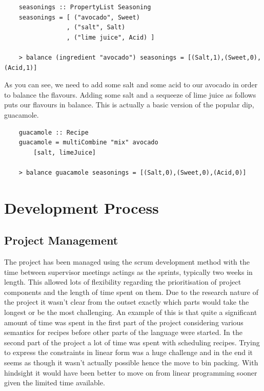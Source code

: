 \documentclass[11pt]{article}
\begin{document}
\begin{lstlisting}
    seasonings :: PropertyList Seasoning
    seasonings = [ ("avocado", Sweet)
                 , ("salt", Salt)
                 , ("lime juice", Acid) ]

    > balance (ingredient "avocado") seasonings = [(Salt,1),(Sweet,0),(Acid,1)]
\end{lstlisting}

As you can see, we need to add some salt and some acid to our avocado in order
to balance the flavours. Adding some salt and a sequeeze of lime juice
as follows puts our flavours in balance. This is actually a basic version
of the popular dip, guacamole.

\begin{lstlisting}
    guacamole :: Recipe
    guacamole = multiCombine "mix" avocado
        [salt, limeJuice]

    > balance guacamole seasonings = [(Salt,0),(Sweet,0),(Acid,0)]
\end{lstlisting}

\section{Development Process}

\subsection{Project Management}

The project has been managed using the scrum development method with the time
between supervisor meetings actings as the sprints, typically two weeks in length.
This allowed lots of flexibility regarding the prioritisation of project
components and the length of time spent on them. Due to the research nature
of the project it wasn't clear from the outset exactly which parts would take the
longest or be the most challenging. An example of this is that
quite a significant amount of time was spent in the first part of the project
considering various semantics for recipes before other parts of the language
were started. In the second part of the project a lot of time was spent
with scheduling recipes. Trying to express the constraints in linear form
was a huge challenge and in the end it seems as though it wasn't actually possible
hence the move to bin packing. With hindsight it would have been better to
move on from linear programming sooner given the limited time available.

\medbreak
\end{document}
